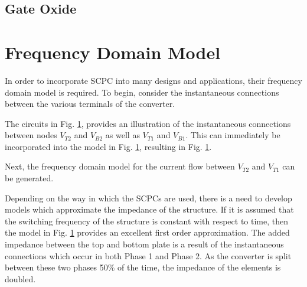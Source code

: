 \subsection{Gate Oxide}

\section{Frequency Domain Model}
In order to incorporate SCPC into many designs and applications, their frequency domain model is required. To begin, consider the instantaneous connections between the various terminals of the converter. 

The circuits in Fig. \ref{}, provides an illustration of the instantaneous connections between nodes $V_{T2}$ and $V_{B2}$ as well as $V_{T1}$ and $V_{B1}$. This can immediately be incorporated into the model in Fig. \ref{}, resulting in Fig. \ref{}. 

Next, the frequency domain model for the current flow between $V_{T2}$ and $V_{T1}$ can be generated. 

Depending on the way in which the SCPCs are used, there is a need to develop models which approximate the impedance of the structure. If it is assumed that the switching frequency of the structure is constant with respect to time, then the model in Fig. \ref{} provides an excellent first order approximation. The added impedance between the top and bottom plate is a result of the instantaneous connections which occur in both Phase 1 and Phase 2. As the converter is split between these two phases 50\% of the time, the impedance of the elements is doubled. 